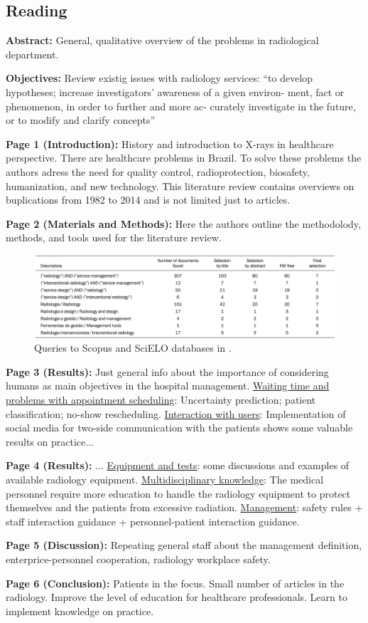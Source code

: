 \subsection{Reading}
    \textbf{Abstract:}
    General, qualitative overview of the problems in radiological department.
    
    \textbf{Objectives:}
    Review existig issues with radiology services: “to develop hypotheses; increase investigators’ awareness of a given environ- ment, fact or phenomenon, in order to further and more ac- curately investigate in the future, or to modify and clarify concepts”
    
    \textbf{Page 1 (Introduction):}
    History and introduction to X-rays in healthcare perspective. There are healthcare problems in Brazil. To solve these problems the authors adress the need for quality control, radioprotection, biosafety, humanization, and new technology. This literature review contains overviews on buplications from 1982 to 2014 and is not limited just to articles. 
    
    \textbf{Page 2 (Materials and Methods):}
    Here the authors outline the methodolody, methods, and tools used for the literature review.
    
    \begin{figure}[H]
        \centering
        \includegraphics[width=.7\textwidth]{figures/SR0016BR15/fig1.png}
        \caption{Queries to Scopus and SciELO databases in \cite{x073}.}
        \label{fig1:SR0016BR15}
    \end{figure}
    
    \textbf{Page 3 (Results):}
    Just general info about the importance of considering humans as main objectives in the hospital management. \underline{Waiting time and problems with appointment scheduling}: Uncertainty prediction; patient classification; no-show rescheduling. \underline{Interaction with users}: Implementation of social media for two-side communication with the patients shows some valuable results on practice... 

    \textbf{Page 4 (Results):}
    ... \underline{Equipment and tests}: some discussions and examples of available radiology equipment. \underline{Multidisciplinary knowledge}: The medical personnel require more education to handle the radiology equipment to protect themselves and the patients from excessive radiation. \underline{Management}: safety rules + staff interaction guidance + personnel-patient interaction guidance.

    \textbf{Page 5 (Discussion):}
    Repeating general staff about the management definition, enterprice-personnel cooperation, radiology workplace safety.
    
    \textbf{Page 6 (Conclusion):}
    Patients in the focus. Small number of articles in the radiology. Improve the level of education for healthcare professionals. Learn to implement knowledge on practice.